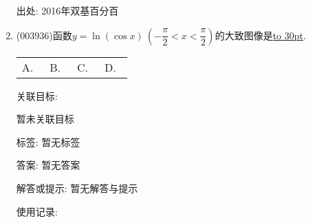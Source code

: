 \documentclass[10pt,a4paper]{article}
\newcommand{\blank}[1]{\underline{\hbox to #1pt{}}}
\newcommand{\fourch}[4]{\par\begin{tabular}{p{.23\textwidth}p{.23\textwidth}p{.23\textwidth}p{.23\textwidth}}
A.~#1 &B.~#2& C.~#3& D.~#4
\end{tabular}}
\begin{document}
\begin{enumerate}[1.]
出处: 2016年双基百分百
\item { (003936)}函数$y=\ln(\cos x) \ \left(-\dfrac{\pi}{2}<x<\dfrac{\pi}{2}\right)$的大致图像是\blank{30}.
\fourch{\begin{tikzpicture}[samples=200,>=stealth]
	\draw [->](-1.5,0)--(0,0) node [above left] {$O$}--(1.5,0) node [below] {$x$};
	\draw [->](0,-1.5)--(0,1.5) node [left] {$y$};
	\draw [dashed] (-1,-1.5)--(-1,1.5) (1,-1.5)--(1,1.5);
	\draw (-1,0) node [below left] {$-\dfrac{\pi}{2}$};
	\draw (1,0) node  [below right] {$\dfrac{\pi}{2}$};
	\draw [domain=-75:75] plot ({\x/90},{ln(cos(\x))});
	\end{tikzpicture}}{\begin{tikzpicture}[samples=200,>=stealth]
	\draw [->](-1.5,0)--(0,0) node [above left] {$O$}--(1.5,0) node [below] {$x$};
	\draw [->](0,-1.5)--(0,1.5) node [left] {$y$};
	\draw [dashed] (-1,-1.5)--(-1,1.5) (1,-1.5)--(1,1.5);
	\draw (-1,0) node [below left] {$-\dfrac{\pi}{2}$};
	\draw (1,0) node  [below right] {$\dfrac{\pi}{2}$};
	\draw [domain=-75:0] plot ({\x/90},{ln(cos(\x))});
	\draw [domain=0:75] plot ({\x/90},{-ln(cos(\x))});
	\end{tikzpicture}}{\begin{tikzpicture}[samples=200,>=stealth]
	\draw [->](-1.5,0)--(0,0) node [below left] {$O$}--(1.5,0) node [below] {$x$};
	\draw [->](0,-1.5)--(0,1.5) node [left] {$y$};
	\draw [dashed] (-1,-1.5)--(-1,1.5) (1,-1.5)--(1,1.5);
	\draw (-1,0) node [below left] {$-\dfrac{\pi}{2}$};
	\draw (1,0) node  [below right] {$\dfrac{\pi}{2}$};
	\draw [domain=-75:0] plot ({\x/90},{-ln(cos(\x))});
	\draw [domain=0:75] plot ({\x/90},{ln(cos(\x))});
	\end{tikzpicture}}{\begin{tikzpicture}[samples=200,>=stealth]
	\draw [->](-1.5,0)--(0,0) node [below left] {$O$}--(1.5,0) node [below] {$x$};
	\draw [->](0,-1.5)--(0,1.5) node [left] {$y$};
	\draw [dashed] (-1,-1.5)--(-1,1.5) (1,-1.5)--(1,1.5);
	\draw (-1,0) node [below left] {$-\dfrac{\pi}{2}$};
	\draw (1,0) node  [below right] {$\dfrac{\pi}{2}$};
	\draw [domain=-75:75] plot ({\x/90},{-ln(cos(\x))});
	\end{tikzpicture}}


关联目标:

暂未关联目标



标签: 暂无标签

答案: 暂无答案

解答或提示: 暂无解答与提示

使用记录:


\end{enumerate}
\end{document}

